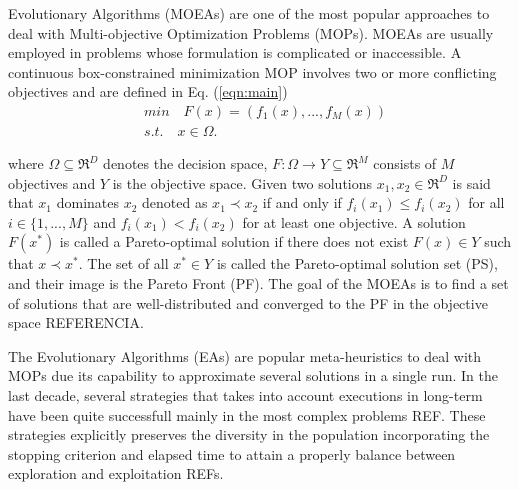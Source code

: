  Evolutionary Algorithms (MOEAs) are one of the most popular approaches to deal with Multi-objective Optimization Problems (MOPs).
%
MOEAs are usually employed in problems whose formulation is complicated or inaccessible.
%
A continuous box-constrained minimization MOP involves two or more conflicting objectives and are defined in Eq. (\ref{eqn:main})
\begin{equation}\label{eqn:main}
\begin{split}
&min \quad F(x) = (f_1(x), ..., f_M(x)) \\
&s.t. \quad x \in \Omega.
\end{split}
\end{equation}

where $\Omega \subseteq \Re^D$ denotes the decision space, $F: \Omega \rightarrow Y \subseteq \Re^M$ consists of $M$ objectives and $Y$ is the objective space.
%
Given two solutions $x_1, x_2 \in \Re^D$ is said that $x_1$ dominates $x_2$ denoted as $x_1 \prec x_2$ if and only if $f_i(x_1) \leq f_i(x_2)$ for all $i \in \{1,...,M\}$ and $f_i(x_1) < f_i(x_2)$ for at least one objective.
%
%
A solution $F(x^*)$ is called a Pareto-optimal solution if there does not exist $F(x) \in Y$ such that $x \prec x^*$.
%
The set of all $x^* \in Y$ is called the Pareto-optimal solution set (PS), and their image is the Pareto Front (PF).
%
The goal of the MOEAs is to find a set of solutions that are well-distributed and converged to the PF in the objective space REFERENCIA.
%

The Evolutionary Algorithms (EAs) are popular meta-heuristics to deal with MOPs due its capability to approximate several solutions in a single run.
%
In the last decade, several strategies that takes into account executions in long-term have been quite successfull mainly in the most complex problems REF.
%
These strategies explicitly preserves the diversity in the population incorporating the stopping criterion and elapsed time to attain a properly balance between exploration and exploitation REFs.
%

